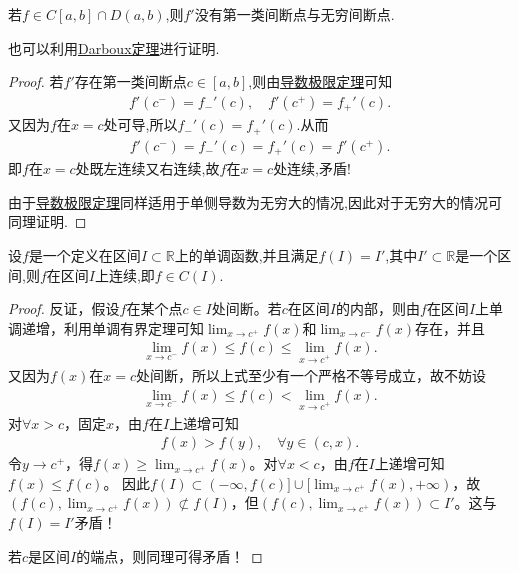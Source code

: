 \documentclass[../../main.tex]{subfiles}%
\begin{document}
\begin{proposition}\label{proposition:导函数没有第一类间断点与无穷间断点}
若$f\in C[a,b]\cap D(a,b)$,则$f'$没有第一类间断点与无穷间断点.
\end{proposition}
\begin{remark}
也可以利用\hyperref[theorem:导数介值定理]{Darboux定理}进行证明.
\end{remark}
\begin{proof}

若$f'$存在第一类间断点$c\in [a,b]$,则由\hyperref[theorem:导数极限定理]{导数极限定理}可知
\begin{align*}
f' \left( c^- \right) =f_{-}'\left( c \right) ,\quad f' \left( c^+ \right) =f_{+}'\left( c \right) .
\end{align*}
又因为$f$在$x=c$处可导,所以$f_{-}'\left( c \right) =f_{+}'\left( c \right)$.从而\
\begin{align*}
f' \left( c^- \right) =f_{-}'\left( c \right) =f_{+}'\left( c \right) =f'\left( c^+ \right) .
\end{align*}
即$f$在$x=c$处既左连续又右连续,故$f$在$x=c$处连续,矛盾!

由于\hyperref[theorem:导数极限定理]{导数极限定理}同样适用于单侧导数为无穷大的情况,因此对于无穷大的情况可同理证明.

\end{proof}

\begin{proposition}\label{proposition:定义是区间的单调函数值域还是区间就必是连续函数}
设$f$是一个定义在区间$I\subset \mathbb{R}$上的单调函数,并且满足$f(I)=I'$,其中$I'\subset \mathbb{R}$是一个区间,则$f$在区间$I$上连续,即$f\in C(I)$.
\end{proposition}
\begin{proof}

反证，假设$f$在某个点$c\in I$处间断。若$c$在区间$I$的内部，则由$f$在区间$I$上单调递增，利用单调有界定理可知$\lim_{x\rightarrow c^+}f(x)$和$\lim_{x\rightarrow c^-}f(x)$存在，并且
\begin{align*}
\lim_{x\rightarrow c^-}f(x) \leqslant f(c) \leqslant \lim_{x\rightarrow c^+}f(x).
\end{align*}
又因为$f(x)$在$x=c$处间断，所以上式至少有一个严格不等号成立，故不妨设
\begin{align*}
\lim_{x\rightarrow c^-}f(x) \leqslant f(c) < \lim_{x\rightarrow c^+}f(x).
\end{align*}
对$\forall x>c$，固定$x$，由$f$在$I$上递增可知
\begin{align*}
f(x) > f(y), \quad \forall y \in (c, x).
\end{align*}
令$y\rightarrow c^+$，得$f(x) \geqslant \lim_{x\rightarrow c^+}f(x)$。对$\forall x<c$，由$f$在$I$上递增可知$f(x) \leqslant f(c)$。
因此$f(I) \subset (-\infty, f(c)] \cup [\lim_{x\rightarrow c^+}f(x), +\infty)$，故$(f(c), \lim_{x\rightarrow c^+}f(x)) \not\subset f(I)$，但$(f(c), \lim_{x\rightarrow c^+}f(x)) \subset I'$。这与$f(I) = I'$矛盾！

若$c$是区间$I$的端点，则同理可得矛盾！

\end{proof}
\end{document}

